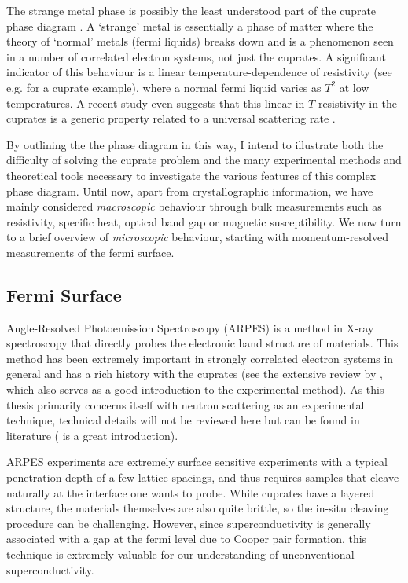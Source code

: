 The strange metal phase is possibly the least understood part of the cuprate phase diagram \cite{Keimer2015}. A `strange' metal is essentially a phase of matter where the theory of `normal' metals (fermi liquids) breaks down and is a phenomenon seen in a number of correlated electron systems, not just the cuprates. A significant indicator of this behaviour is a linear temperature-dependence of resistivity (see e.g. \cite{Martin1990} for a cuprate example), where a normal fermi liquid varies as $T^2$ at low temperatures. A recent study even suggests that this linear-in-$T$ resistivity in the cuprates is a generic property related to a universal scattering rate \cite{Legros2018}.

By outlining the the phase diagram in this way, I intend to illustrate both the difficulty of solving the cuprate problem and the many experimental methods and theoretical tools necessary to investigate the various features of this complex phase diagram. Until now, apart from crystallographic information, we have mainly considered \emph{macroscopic} behaviour through bulk measurements such as resistivity, specific heat, optical band gap or magnetic susceptibility. We now turn to a brief overview of \emph{microscopic} behaviour, starting with momentum-resolved measurements of the fermi surface.

\subsection{Fermi Surface}
Angle-Resolved Photoemission Spectroscopy (ARPES) is a method in X-ray spectroscopy that directly probes the electronic band structure of materials. This method has been extremely important in strongly correlated electron systems in general and has a rich history with the cuprates (see the extensive review by \citeauthor{Damascelli2003} \cite{Damascelli2003}, which also serves as a good introduction to the experimental method). As this thesis primarily concerns itself with neutron scattering as an experimental technique, technical details will not be reviewed here but can be found in literature (\cite{Osterwalder2014} is a great introduction).

ARPES experiments are extremely surface sensitive experiments with a typical penetration depth of a few lattice spacings, and thus requires samples that cleave naturally at the interface one wants to probe. While cuprates have a layered structure, the materials themselves are also quite brittle, so the in-situ cleaving procedure can be challenging. However, since superconductivity is generally associated with a gap at the fermi level due to Cooper pair formation, this technique is extremely valuable for our understanding of unconventional superconductivity.

